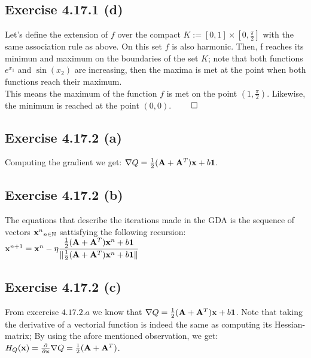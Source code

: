 \documentclass{exam}
\renewenvironment{proof}{{\noindent\itshape\ignorespaces}}{{\hfill$\qed$\\}}
\begin{document}
\subsection*{Exercise 4.17.1 (d)}
\begin{proof}
    Let's define the extension of $f$ over the compact $K := [0,1] \times [0, \frac{\pi}{2}]$ with the same association rule as above. On this set $f$ is also harmonic. Then, 
    f reaches its minimun and maximum  on the boundaries of the set $K$; note that both functions $e^{x_1}$ and $\sin(x_2)$ are increasing, then the maxima is met at the point when both functions
    reach their maximum. \\
    
    \noindent This means the maximum of the function $f$ is met on the point $(1,\frac{\pi}{2})$. Likewise, the minimum is reached at the point $(0,0)$.
\end{proof}

\subsection*{Exercise 4.17.2 (a)}
Computing the gradient we get: $\nabla Q = \frac{1}{2}(\bold{A}  + \bold{A}^{T})\bold{x} + b\boldsymbol{1}$.

\subsection*{Exercise 4.17.2 (b)}
The equations that describe the iterations made in the GDA is the sequence of vectors ${\bold{x}^n}_{n \in \mathbb{N}}$ sattisfying the following 
recursion:
$\bold{x}^{n+1} = \bold{x}^{n} - \eta \displaystyle\frac{\frac{1}{2}(\bold{A}  + \bold{A}^{T})\bold{x}^{n} + b\boldsymbol{1}}{\lVert \frac{1}{2}(\bold{A}  + \bold{A}^{T})\bold{x}^{n} + b\boldsymbol{1} \lVert}$ 
\subsection*{Exercise 4.17.2 (c)}
From excercise $4.17.2.a$ we know that $\nabla Q = \frac{1}{2}(\bold{A}  + \bold{A}^{T})\bold{x} + b\boldsymbol{1}$. Note that taking the derivative of a vectorial 
function is indeed the same as computing its Hessian-matrix; By using the afore mentioned observation, we get:\\

$H_{Q}(\bold{x}) = \frac{\partial}{\partial \bold{x}} \nabla Q = \frac{1}{2}(\bold{A}  + \bold{A}^{T})$.
\end{document}
